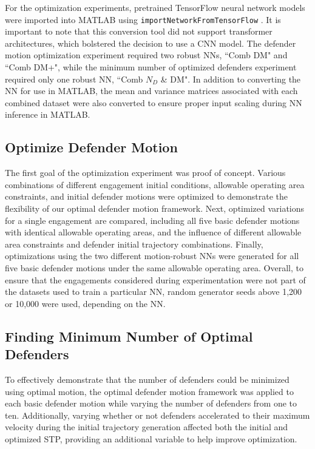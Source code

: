 \documentclass[journal]{IEEEtran} %
\begin{document}
For the optimization experiments, pretrained TensorFlow neural network models were imported into MATLAB using \texttt{importNetworkFromTensorFlow} \cite{mathworks_inc_importnetworkfromtensorflow_2024}. It is important to note that this conversion tool did not support transformer architectures, which bolstered the decision to use a CNN model. The defender motion optimization experiment required two robust NNs, ``Comb DM" and ``Comb DM+", while the minimum number of optimized defenders experiment required only one robust NN, ``Comb $N_D$ \& DM". In addition to converting the NN for use in MATLAB, the mean and variance matrices associated with each combined dataset were also converted to ensure proper input scaling during NN inference in MATLAB.


\subsection{Optimize Defender Motion}


The first goal of the optimization experiment was proof of concept. Various combinations of different engagement initial conditions, allowable operating area constraints, and initial defender motions were optimized to demonstrate the flexibility of our optimal defender motion framework. Next, optimized variations for a single engagement are compared, including all five basic defender motions with identical allowable operating areas, and the influence of different allowable area constraints and defender initial trajectory combinations. Finally, optimizations using the two different motion-robust NNs were generated for all five basic defender motions under the same allowable operating area. Overall, to ensure that the engagements considered during experimentation were not part of the datasets used to train a particular NN, random generator seeds above 1,200 or 10,000 were used, depending on the NN. 


\subsection{Finding Minimum Number of Optimal Defenders}


To effectively demonstrate that the number of defenders could be minimized using optimal motion, the optimal defender motion framework was applied to each basic defender motion while varying the number of defenders from one to ten. Additionally, varying whether or not defenders accelerated to their maximum velocity during the initial trajectory generation affected both the initial and optimized STP, providing an additional variable to help improve optimization.
\end{document}
